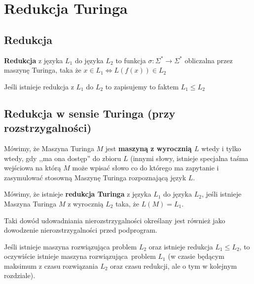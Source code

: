 \section{Redukcja Turinga}

\subsection{Redukcja} 

\begin{definition}

    \textbf{Redukcja} z języka \( L_1 \) do języka \( L_2 \) to funkcja \( \sigma: \Sigma^* \rightarrow \Sigma^*\) obliczalna przez maszynę Turinga, taka że \( x \in L_1 \iff L(f(x)) \in L_2 \)
    
    Jeśli istnieje redukcja z \( L_1 \) do \( L_2 \) to zapisujemy to faktem \( L_1 \leq L_2 \)
\end{definition}

\subsection{Redukcja w sensie Turinga (przy rozstrzygalności)}

\begin{definition}
    Mówimy, że Maszyna Turinga \(M\) jest \textbf{maszyną z wyrocznią \(L\)} wtedy i tylko wtedy, gdy ,,ma ona dostęp'' do zbioru \(L\) (innymi słowy, istnieje specjalna taśma wejściowa na którą \(M\) może wpisać słowo co do którego ma zapytanie i zasymulować stosowną Maszynę Turinga rozpoznającą język \(L\). 
\end{definition}

\begin{definition}
    Mówimy, że istnieje \textbf{redukcja Turinga} z języka \(L_1 \) do języka \( L_2\), jeśli istnieje Maszyna Turinga \(M\) z wyrocznią \(L_2\) taka, że \(L(M) = L_1\). 
    
    Taki dowód udowadniania nierozstrzygalności określany jest również jako dowodzenie nierozstrzygalności przed podprogram.
\end{definition}

\begin{corollary}
    Jeśli istnieje maszyna rozwiązująca problem \(L_2\) oraz istnieje redukcja \(L_1 \leq L_2 \), to oczywiście istnieje maszyna rozwiązująca\
    problem \(L_1\) (w czasie będącym maksimum z czasu rozwiązania \(L_2\) oraz czasu redukcji, ale o tym w kolejnym rozdziale).
\end{corollary}
